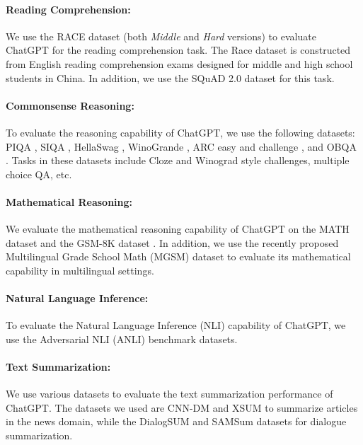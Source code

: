 \documentclass[11pt]{article}
\begin{document}
\paragraph{Reading Comprehension:} We use the RACE
dataset (both \textit{Middle} and \textit{Hard} versions) \cite{lai2017race} to evaluate ChatGPT for the reading comprehension task. The Race dataset is constructed from English reading comprehension
exams designed for middle and high school students in China. In addition, we use the SQuAD 2.0 dataset \cite{rajpurkar2018know} for this task.

     \paragraph{Commonsense Reasoning:} To evaluate the reasoning capability of ChatGPT, we use the following datasets: PIQA \cite{bisk2020piqa}, SIQA \cite{sap2019siqa}, HellaSwag \cite{zellers2019hellaswag}, WinoGrande \cite{sakaguchi2020winogrande}, ARC easy and challenge \cite{clark2018thinkarc}, and OBQA \cite{mihaylov2018obqa}. Tasks in these datasets include Cloze and Winograd style challenges, multiple choice QA, etc. 

    \paragraph{Mathematical Reasoning:} We evaluate the mathematical reasoning capability of ChatGPT on the MATH dataset \cite{hendrycksmath2021} and the GSM-8K dataset \cite{cobbe2021traininggsm8k}. In addition, we use the recently proposed Multilingual Grade School Math (MGSM) \cite{shi2022languagemgsm} dataset to evaluate its mathematical capability in multilingual settings. 

     \paragraph{Natural Language Inference:} To evaluate the Natural Language Inference (NLI) capability of ChatGPT, we use the Adversarial NLI (ANLI) \cite{nie-etal-2020-adversarial} benchmark datasets.

       
    \paragraph{Text Summarization:} We use various datasets to evaluate the text summarization performance of ChatGPT. The datasets we used are CNN-DM \cite{see-etal-2017-get,hermann2015teaching} and XSUM \cite{narayan2018donxsum} to summarize articles in the news domain, while the  DialogSUM \cite{chen2021dialogsum} and SAMSum \cite{gliwa2019samsum} datasets for dialogue summarization. 
\end{document}
